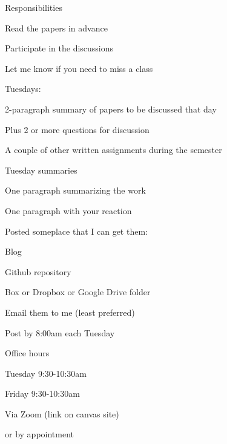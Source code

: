 \documentclass[aspectratio=169,12pt,t]{beamer}
\begin{document}
\begin{frame}{Responsibilities}

  \bbi
\item Read the papers in advance
\item Participate in the discussions
\item Let me know if you need to miss a class
\item Tuesdays:
  \bi
  \item 2-paragraph summary of papers to be discussed that day
  \item Plus 2 or more questions for discussion
  \ei
\item A couple of other written assignments during the semester
  \ei

\end{frame}



\begin{frame}{Tuesday summaries}

  \bbi
\item One paragraph summarizing the work
\item One paragraph with your reaction
\item Posted someplace that I can get them:
  \bi
\item Blog
\item Github repository
\item Box or Dropbox or Google Drive folder
\item Email them to me (least preferred)
  \ei
\item Post by 8:00am each Tuesday
\ei

\end{frame}


\begin{frame}{Office hours}

  \bbi
\item Tuesday 9:30-10:30am
\item Friday 9:30-10:30am
\item Via Zoom (link on canvas site)
\item \hilit or by appointment
\ei

\end{frame}
\end{document}
